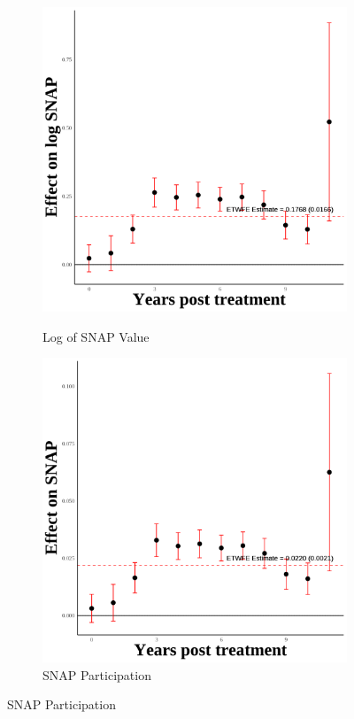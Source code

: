 \documentclass[12pt,english]{article}
\begin{document}
\begin{figure}[H]
  \vspace{0.3cm} %

  \begin{subfigure}[b]{0.3\textwidth}
    \centering
    \caption{Log of SNAP Value}
    \includegraphics[width=\linewidth]{figures/plot20-ln_snap_event_study-second.png}
    \label{fig:ln-snap-second}
  \end{subfigure}
  \hfill
  \begin{subfigure}[b]{0.3\textwidth}
    \centering
    \caption{SNAP Participation}
    \includegraphics[width=\linewidth]{figures/plot21-snap_event_study-second.png}

\end{subfigure}
\end{figure}
\end{document}
